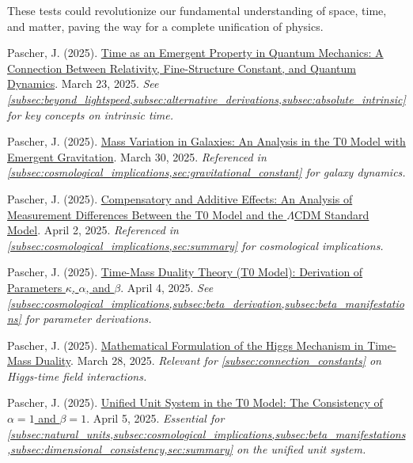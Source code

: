 \documentclass[12pt,a4paper]{article}
\begin{document}
	These tests could revolutionize our fundamental understanding of space, time, and matter, paving the way for a complete unification of physics.
	
	\begin{thebibliography}{99}
		 Pascher, J. (2025). \href{https://github.com/jpascher/T0-Time-Mass-Duality/tree/main/2/pdf/English/ZeitEmergentQMEn.pdf}{Time as an Emergent Property in Quantum Mechanics: A Connection Between Relativity, Fine-Structure Constant, and Quantum Dynamics}. March 23, 2025. \textit{See \cref{subsec:beyond_lightspeed,subsec:alternative_derivations,subsec:absolute_intrinsic} for key concepts on intrinsic time.}
		
		 Pascher, J. (2025). \href{https://github.com/jpascher/T0-Time-Mass-Duality/tree/main/2/pdf/English/MassVarGalaxienEn.pdf}{Mass Variation in Galaxies: An Analysis in the T0 Model with Emergent Gravitation}. March 30, 2025. \textit{Referenced in \cref{subsec:cosmological_implications,sec:gravitational_constant} for galaxy dynamics.}
		
		 Pascher, J. (2025). \href{https://github.com/jpascher/T0-Time-Mass-Duality/tree/main/2/pdf/English/MessdifferenzenT0StandardEn.pdf}{Compensatory and Additive Effects: An Analysis of Measurement Differences Between the T0 Model and the $\Lambda$CDM Standard Model}. April 2, 2025. \textit{Referenced in \cref{subsec:cosmological_implications,sec:summary} for cosmological implications.}
		
		 Pascher, J. (2025). \href{https://github.com/jpascher/T0-Time-Mass-Duality/tree/main/2/pdf/English/ZeitMasseT0ParamsEn.pdf}{Time-Mass Duality Theory (T0 Model): Derivation of Parameters $\kappa$, $\alpha$, and $\beta$}. April 4, 2025. \textit{See \cref{subsec:cosmological_implications,subsec:beta_derivation,subsec:beta_manifestations} for parameter derivations.}
		
		 Pascher, J. (2025). \href{https://github.com/jpascher/T0-Time-Mass-Duality/tree/main/2/pdf/English/MathHiggsZeitMasseEn.pdf}{Mathematical Formulation of the Higgs Mechanism in Time-Mass Duality}. March 28, 2025. \textit{Relevant for \cref{subsec:connection_constants} on Higgs-time field interactions.}
		
		 Pascher, J. (2025). \href{https://github.com/jpascher/T0-Time-Mass-Duality/tree/main/2/pdf/English/Alpha1Beta1KonsistenzEn.pdf}{Unified Unit System in the T0 Model: The Consistency of $\alpha = 1$ and $\beta = 1$}. April 5, 2025. \textit{Essential for \cref{subsec:natural_units,subsec:cosmological_implications,subsec:beta_manifestations,subsec:dimensional_consistency,sec:summary} on the unified unit system.}
		

\end{thebibliography}
\end{document}
